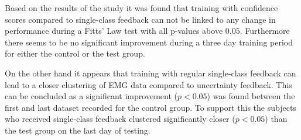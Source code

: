 Based on the results of the study it was found that training with confidence scores compared to single-class feedback can not be linked to any change in performance during a Fitts' Law test with all p-values above $0.05$. Furthermore there seems to be no significant improvement during a three day training period for either the control or the test group. 

On the other hand it appears that training with regular single-class feedback can lead to a closer clustering of EMG data compared to uncertainty feedback. This can be concluded as a significant improvement ($p < 0.05$) was found between the first and last dataset recorded for the control group. To support this the subjects who received single-class feedback clustered significantly closer ($p < 0.05$) than the test group on the last day of testing.